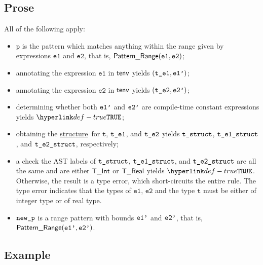 \documentclass{book}
\newcommand\ProseOrTypeError[0]{\ProseTerminateAs{\TypeErrorConfig}}
\newcommand\structure[0]{\hyperlink{def-structure}{structure}}
\newcommand\vp[0]{\texttt{p}}
\newcommand\vt[0]{\texttt{t}}
\newcommand\veone[0]{\texttt{e1}}
\newcommand\vetwo[0]{\texttt{e2}}
\begin{document}
\subsection{Prose}
All of the following apply:
\begin{itemize}
  \item $\vp$ is the pattern which matches anything within the range given by
  expressions $\veone$ and $\vetwo$, that is, $\PatternRange(\veone, \vetwo)$;
  \item annotating the expression $\veone$ in $\textsf{tenv}$ yields $(\texttt{t\_e1}, \texttt{e1'})$\ProseOrTypeError;
  \item annotating the expression $\vetwo$ in $\textsf{tenv}$ yields $(\texttt{t\_e2}, \texttt{e2'})$\ProseOrTypeError;
  \item determining whether both $\texttt{e1'}$ and $\texttt{e2'}$ are compile-time constant expressions yields $\True$\ProseOrTypeError;
  \item obtaining the \structure\ for $\vt$, $\texttt{t\_e1}$, and $\texttt{t\_e2}$ yields
        $\texttt{t\_struct}$, $\texttt{t\_e1\_struct}$, and $\texttt{t\_e2\_struct}$, respectively\ProseOrTypeError;
  \item a check the AST labels of $\texttt{t\_struct}$, $\texttt{t\_e1\_struct}$, and $\texttt{t\_e2\_struct}$ are all the same and are either
        $\textsf{T\_Int}$ or $\textsf{T\_Real}$ yields $\True$. Otherwise, the result is a type error, which short-circuits the entire rule.
        The type error indicates that the types of
        $\veone$, $\vetwo$ and the type $\vt$ must be either of integer type or of real type.
  \item $\texttt{new\_p}$ is a range pattern with bounds $\texttt{e1'}$ and $\texttt{e2'}$, that is, $\textsf{Pattern\_Range}(\texttt{e1'}, \texttt{e2'})$.
\end{itemize}

\subsection{Example}

\end{document}
